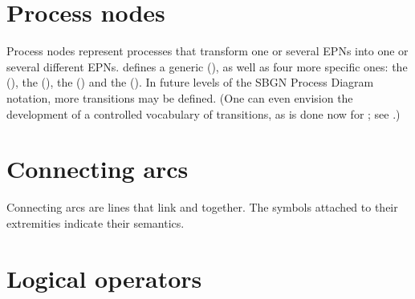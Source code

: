 \section{Process nodes}\label{sec:PNs}

Process nodes represent processes that transform one or several EPNs into one or several different EPNs.   \SBGNPDLone defines a generic  (), as well as four more specific ones: the  (), the  (), the  () and the  ().  In future levels of the SBGN Process Diagram notation, more transitions may be defined.  (One can even envision the development of a controlled vocabulary of transitions, as is done now for ; see .)









\section{Connecting arcs}\label{sec:arcs}

Connecting arcs are lines that link  and  together.  The symbols attached to their extremities indicate their semantics.













\section{Logical operators}\label{sec:logic}








